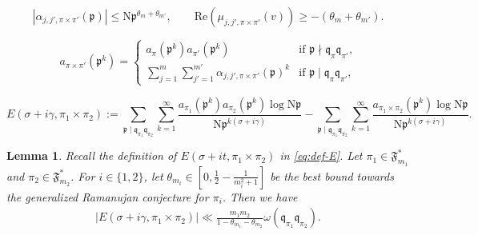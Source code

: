 \documentclass[10pt,a4paper]{amsart}
\newtheorem{lem}{Lemma}
\newcommand{\N}{\mathrm{N}}
\newcommand{\kn}{\mathfrak{n}}
\newcommand{\kp}{\mathfrak{p}}
\newcommand{\kq}{\mathfrak{q}}
\begin{document}
	\begin{equation}
		\label{eqn:GRC2}
	|\alpha_{j,j',\pi\times\pi'}(\kp)|\leq  \N\kp^{\theta_m+\theta_{m'}},\qquad \mathrm{Re}(\mu_{j,j',\pi\times\pi'}(v))\geq -(\theta_m+\theta_{m'}).
	\end{equation}

	\begin{equation}
	\label{eq:a-rankin-selberg}
	a_{\pi\times\pi'}(\kp^{k})= \begin{cases}
 	a_{\pi}(\kp^{k})a_{\pi'}(\kp^{k})&\mbox{if $\kp  \nmid \kq_{\pi}\kq_{\pi'}$,}\\
 	\sum_{j=1}^m \sum_{j'=1}^{m'}\alpha_{j,j',\pi\times\pi'}(\kp)^{k}&\mbox{if $\kp  \mid \kq_{\pi}\kq_{\pi'}$,}
 \end{cases}%
	\end{equation}

	\begin{equation}\label{eq:def-E}
		E(\sigma+ i\gamma, \pi_1 \times \pi_2) :=  \sum_{\kp  \mid \kq_{\pi_1}\kq_{\pi_2}} \sum_{k=1}^{\infty} \frac{a_{\pi_1}(\kp^k)a_{\pi_2}(\kp^k)\log \N\kp}{\N\kp^{k(\sigma+i\gamma)}} 
		- \sum_{\kp  \mid \kq_{\pi_1}\kq_{\pi_2}} \sum_{k=1}^{\infty} \frac{a_{\pi_1 \times \pi_2}(\kp^k)\log \N\kp} {\N\kp^{k(\sigma+i\gamma)}}.
	\end{equation}

    \begin{lem}\label{lem:general-error}
		Recall the definition of $E(\sigma+it, \pi_1 \times \pi_2)$ in \eqref{eq:def-E}. Let $\pi_1 \in \mathfrak{F}_{m_1}^*$ and $\pi_2 \in \mathfrak{F}_{m_2}^*$.%
        For $i \in\{1,2\}$, let $\theta_{m_i} \in[0,\frac{1}{2}-\frac{1}{m_i^2+1}]$ be the best bound towards the generalized Ramanujan conjecture for $\pi_i$. Then we have 
		\begin{equation*}%
			\begin{aligned}
				|E(\sigma+ i\gamma, \pi_1\times \pi_2)|
				\ll \frac{m_1m_2}{1-\theta_{m_1}-\theta_{m_2}}\omega(\kq_{\pi_1}\kq_{\pi_2}).%
			\end{aligned}
		\end{equation*}
	\end{lem}
\end{document}
